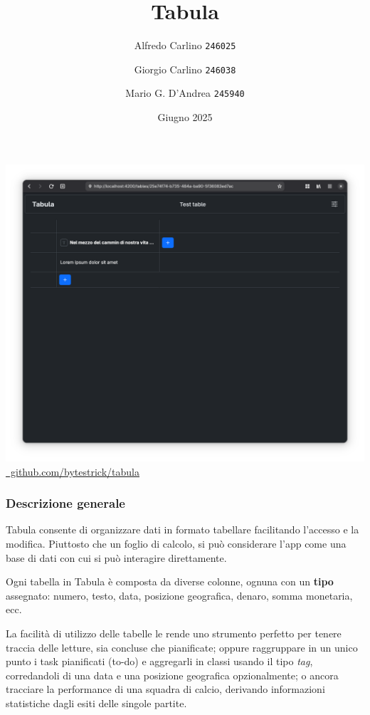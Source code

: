 \documentclass{beamer}
\title{Tabula}
\author{
  Alfredo Carlino \texttt{246025} \newline
  \and Giorgio Carlino \texttt{246038} \newline
  \and Mario G. D'Andrea \texttt{245940}}
\institute{Corso di Web Applications \\ C.d.S. Informatica $\cdot$ DeMaCs \\ Università della Calabria}
\date{Giugno 2025}
\begin{document}
\maketitle

\begin{frame}
  \includegraphics[width=\textwidth]{demo}
  \centering  \href{https://github.com/bytestrick/tabula}{\faGithub\ github.com/bytestrick/tabula}
\end{frame}

\begin{frame}
  \frametitle{Descrizione generale}

  Tabula consente di organizzare dati in formato tabellare facilitando l'accesso e la modifica. Piuttosto che un foglio di calcolo, si può considerare l'app come una base di dati con cui si può interagire direttamente.

  \vspace{10pt}

  Ogni tabella in Tabula è composta da diverse colonne, ognuna con un \textbf{tipo} assegnato: numero, testo, data, posizione geografica, denaro, somma monetaria, ecc.

  \vspace{10pt}

  La facilità di utilizzo delle tabelle le rende uno strumento perfetto per tenere traccia delle letture, sia concluse che pianificate; oppure raggruppare in un unico punto i task pianificati (to-do) e aggregarli in classi usando il tipo \textit{tag}, corredandoli di una data e una posizione geografica opzionalmente; o ancora tracciare la performance di una squadra di calcio, derivando informazioni statistiche dagli esiti delle singole partite.

\end{frame}
\end{document}
